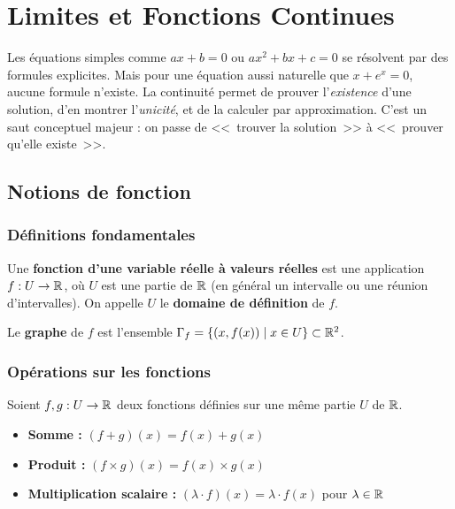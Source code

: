\chapter{Limites et Fonctions Continues}

\begin{intuitionbox}[Motivation]
Les équations simples comme $ax + b = 0$ ou $ax^2 + bx + c = 0$ se résolvent par des formules explicites. Mais pour une équation aussi naturelle que $x + e^x = 0$, aucune formule n'existe. La continuité permet de prouver l'\emph{existence} d'une solution, d'en montrer l'\emph{unicité}, et de la calculer par approximation. C'est un saut conceptuel majeur : on passe de <<~trouver la solution~>> à <<~prouver qu'elle existe~>>.
\end{intuitionbox}


\section{Notions de fonction}

\subsection{Définitions fondamentales}

\begin{defbox}
Une \textbf{fonction d'une variable réelle à valeurs réelles} est une application $f : U \to \mathbb{R}$, où $U$ est une partie de $\mathbb{R}$ (en général un intervalle ou une réunion d'intervalles). On appelle $U$ le \textbf{domaine de définition} de $f$.

Le \textbf{graphe} de $f$ est l'ensemble $\Gamma_f = \{(x, f(x)) \mid x \in U\} \subset \mathbb{R}^2$.
\end{defbox}

\subsection{Opérations sur les fonctions}

Soient $f, g : U \to \mathbb{R}$ deux fonctions définies sur une même partie $U$ de $\mathbb{R}$.

\begin{propbox}
\begin{itemize}[leftmargin=1cm]
  \item \textbf{Somme :} $(f + g)(x) = f(x) + g(x)$
  \item \textbf{Produit :} $(f \times g)(x) = f(x) \times g(x)$
  \item \textbf{Multiplication scalaire :} $(\lambda \cdot f)(x) = \lambda \cdot f(x)$ pour $\lambda \in \mathbb{R}$
\end{itemize}
\end{propbox}

